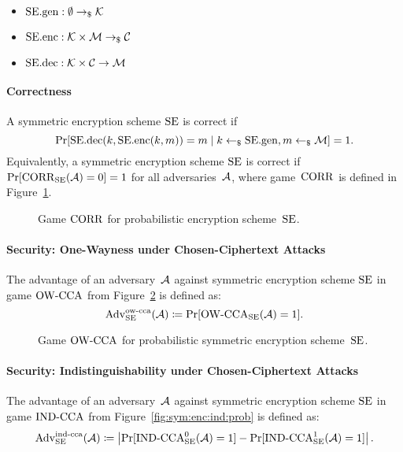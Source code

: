 \documentclass[a4paper,orivec]{llncs}
\begin{document}
\begin{itemize}
    \item $\mathrm{SE}.\mathrm{gen}: \emptyset \to_\$ \mathcal{K}$
    \item $\mathrm{SE}.\mathrm{enc}: \mathcal{K}\times\mathcal{M} \to_\$ \mathcal{C}$
    \item $\mathrm{SE}.\mathrm{dec}: \mathcal{K}\times\mathcal{C} \to \mathcal{M}$
\end{itemize}

\paragraph{Correctness}
A symmetric encryption scheme $\mathrm{SE}$ is correct if 
\[
\Pr[\mathrm{SE}.\mathrm{dec}(k,\mathrm{SE}.\mathrm{enc}(k,m))=m\mid k\gets_\$\mathrm{SE}.\mathrm{gen},m\gets_\$\mathcal{M}]=1\text{.}
\]
Equivalently, a symmetric encryption scheme $\mathrm{SE}$ is correct if $\Pr[\mathrm{CORR}_{\mathrm{SE}}(\mathcal{A})=0]=1$ for all adversaries~$\mathcal{A}$, where game~$\mathrm{CORR}$ is defined in Figure~\ref{fig:sym:enc:corr:prob}.

\begin{figure}[!ht]
    \centering
    \nicoresetlinenr%
    \fbox{%
        \scalebox{\codescalefactor}{%
        }%
    }
    \caption{%
        Game $\mathrm{CORR}$ for probabilistic encryption scheme~$\mathrm{SE}$.
    }
    \label{fig:sym:enc:corr:prob}
\end{figure}

\paragraph{Security: One-Wayness under Chosen-Ciphertext Attacks}
The advantage of an adversary~$\mathcal{A}$ against symmetric encryption scheme $\mathrm{SE}$ in game ${\mathrm{OW}\text{-}\mathrm{CCA}}$ from Figure~\ref{fig:sym:enc:ow:prob} is defined as:
\[
\mathrm{Adv}_{\mathrm{SE}}^{\mathrm{ow}\text{-}\mathrm{cca}}(\mathcal{A})\coloneqq\Pr[{\mathrm{OW}\text{-}\mathrm{CCA}}_{\mathrm{SE}}(\mathcal{A})=1]\text{.}
\]

\begin{figure}[!ht]
    \centering
    \nicoresetlinenr%
    \fbox{%
        \scalebox{\codescalefactor}{%
        }%
    }
    \caption{%
        Game ${\mathrm{OW}\text{-}\mathrm{CCA}}$ for probabilistic symmetric encryption scheme~$\mathrm{SE}$.
    }
    \label{fig:sym:enc:ow:prob}
\end{figure}

\paragraph{Security: Indistinguishability under Chosen-Ciphertext Attacks}
The advantage of an adversary~$\mathcal{A}$ against symmetric encryption scheme $\mathrm{SE}$ in game ${\mathrm{IND}\text{-}\mathrm{CCA}}$ from Figure~\ref{fig:sym:enc:ind:prob} is defined as:
\[
\mathrm{Adv}_{\mathrm{SE}}^{\mathrm{ind}\text{-}\mathrm{cca}}(\mathcal{A})\coloneqq\left|\Pr[{\mathrm{IND}\text{-}\mathrm{CCA}}_{\mathrm{SE}}^0(\mathcal{A})=1]-\Pr[{\mathrm{IND}\text{-}\mathrm{CCA}}_{\mathrm{SE}}^1(\mathcal{A})=1]\right|\text{.}
\]
\end{document}
